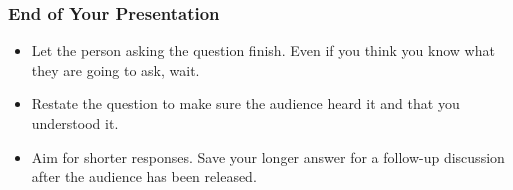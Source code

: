  \subsubsection*{End of Your Presentation}

\begin{itemize}
    \item Let the person asking the question finish. Even if you think you know what they are going to ask, wait.
    \item Restate the question to make sure the audience heard it and that you understood it.
    \item Aim for shorter responses. Save your longer answer for a follow-up discussion after the audience has been released.
\end{itemize}


